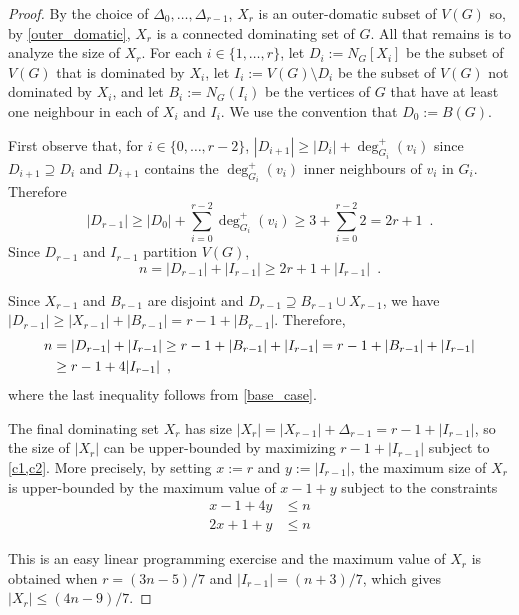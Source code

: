 \documentclass[12pt]{article}
\begin{document}
\begin{proof}
By the choice of $\Delta_0,\ldots,\Delta_{r-1}$, $X_r$ is an outer-domatic subset of $V(G)$ so, by \cref{outer_domatic}, $X_r$ is a connected dominating set of $G$.  All that remains is to analyze the size of $X_r$.  For each $i\in\{1,\ldots,r\}$, let $D_i:=N_G[X_i]$ be the subset of $V(G)$ that is dominated by $X_i$, let $I_i:=V(G)\setminus D_i$ be the subset of $V(G)$ not dominated by $X_i$, and let $B_i:=N_G(I_i)$ be the vertices of $G$ that have at least one neighbour in each of $X_i$ and $I_i$.  We use the convention that $D_0:=B(G)$.

First observe that, for $i\in\{0,\ldots,r-2\}$, $|D_{i+1}|\ge |D_i|+\deg_{G_i}^+(v_i)$ since $D_{i+1}\supseteq D_i$ and $D_{i+1}$ contains the $\deg_{G_i}^+(v_i)$ inner neighbours of $v_i$ in $G_i$.  Therefore
\[
    |D_{r-1}| \ge |D_0| + \sum_{i=0}^{r-2} \deg_{G_i}^+(v_i) \ge 3 + \sum_{i=0}^{r-2} 2 =  2r+1 \enspace . \label{double_d}
\]
Since $D_{r-1}$ and $I_{r-1}$ partition $V(G)$,
\begin{equation}
  n = |D_{r-1}| + |I_{r-1}| \ge 2r+1 + |I_{r-1}|  \enspace . \label{c1}
\end{equation}

Since $X_{r-1}$ and $B_{r-1}$ are disjoint and $D_{r-1}\supseteq B_{r-1}\cup X_{r-1}$, we have $|D_{r-1}|\ge |X_{r-1}| + |B_{r-1}|=r-1+|B_{r-1}|$.  Therefore,
\begin{align}
    n & = |D_{r-1}| + |I_{r-1}| \ge r-1 + |B_{r-1}| + |I_{r-1}| = r-1 + |B_{r-1}| + |I_{r-1}| \notag
    \\
    & \ge r - 1 + 4|I_{r-1}| \enspace , \label{c2}
\end{align}
where the last inequality follows from \cref{base_case}.

The final dominating set $X_r$ has size $|X_r| = |X_{r-1}| + \Delta_{r-1} = r - 1 +|I_{r-1}|$, so the size of $|X_r|$ can be upper-bounded by maximizing $r-1+|I_{r-1}|$ subject to \cref{c1,c2}.  More precisely, by setting $x:=r$ and $y:=|I_{r-1}|$, the maximum size of $X_r$ is upper-bounded by the maximum value of $x-1+y$ subject to the constraints
\begin{align*}
  x - 1 + 4y & \le n \\
  2x + 1 + y & \le n
\end{align*}

This is an easy linear programming exercise and the maximum value of $X_{r}$ is obtained when $r=(3n-5)/7$ and $|I_{r-1}|=(n+3)/7$, which gives
$|X_r| \le (4n-9)/7$.
\end{proof}
\end{document}
